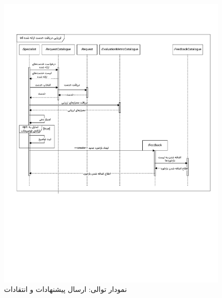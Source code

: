 \begin{figure}[ht!]
	\centering
	\includegraphics[scale=0.8, page=6]{figs/OOD-Sequence-3.pdf}
	\caption{نمودار توالی: ارسال پیشنهادات و انتقادات}
\end{figure}

\FloatBarrier
\newpage

